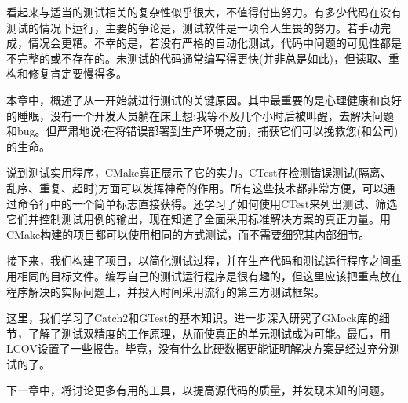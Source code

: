 

看起来与适当的测试相关的复杂性似乎很大，不值得付出努力。有多少代码在没有测试的情况下运行，主要的争论是，测试软件是一项令人生畏的努力。若手动完成，情况会更糟。不幸的是，若没有严格的自动化测试，代码中问题的可见性都是不完整的或不存在的。未测试的代码通常编写得更快(并非总是如此)，但读取、重构和修复肯定要慢得多。

本章中，概述了从一开始就进行测试的关键原因。其中最重要的是心理健康和良好的睡眠，没有一个开发人员躺在床上想:我等不及几个小时后被叫醒，去解决问题和bug。但严肃地说:在将错误部署到生产环境之前，捕获它们可以挽救您(和公司)的生命。

说到测试实用程序，CMake真正展示了它的实力。CTest在检测错误测试(隔离、乱序、重复、超时)方面可以发挥神奇的作用。所有这些技术都非常方便，可以通过命令行中的一个简单标志直接获得。还学习了如何使用CTest来列出测试、筛选它们并控制测试用例的输出，现在知道了全面采用标准解决方案的真正力量。用CMake构建的项目都可以使用相同的方式测试，而不需要细究其内部细节。

接下来，我们构建了项目，以简化测试过程，并在生产代码和测试运行程序之间重用相同的目标文件。编写自己的测试运行程序是很有趣的，但这里应该把重点放在程序解决的实际问题上，并投入时间采用流行的第三方测试框架。

这里，我们学习了Catch2和GTest的基本知识。进一步深入研究了GMock库的细节，了解了测试双精度的工作原理，从而使真正的单元测试成为可能。最后，用LCOV设置了一些报告。毕竟，没有什么比硬数据更能证明解决方案是经过充分测试的了。

下一章中，将讨论更多有用的工具，以提高源代码的质量，并发现未知的问题。








